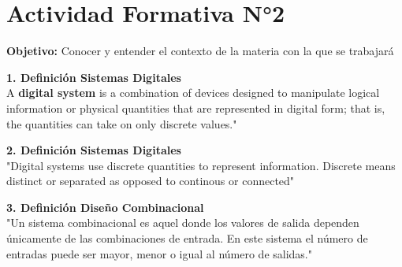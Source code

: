 \documentclass[12pt]{article}
\begin{document}
\begin{titlepage}
\begin{center}
\par{}

\begin{flushright}
\par{}
\end{flushright}

\end{center}

\par{}


\end{titlepage}




\section{Actividad Formativa N°2}
\vspace{1cm}
{\large \textbf{Objetivo:}} Conocer y entender el contexto de la materia con la que se trabajará

\vspace{.35cm}

\large\textbf{1. Definición Sistemas Digitales} \\
\normalsize A \textbf{digital system} is a combination of devices designed to manipulate logical information or physical quantities that are represented in digital form; that is, the quantities can take on only discrete values." \cite{tocci}

\vspace{.35cm}

\large\textbf{2. Definición Sistemas Digitales} \\
\normalsize "Digital systems use discrete quantities to represent information. Discrete means distinct or separated as opposed to continous or connected" \cite{godse} 

\vspace{.35cm}

\large\textbf{3. Definición Diseño Combinacional} \\
\normalsize "Un sistema combinacional es aquel donde los valores de salida dependen únicamente de las combinaciones de entrada. En este sistema el número de entradas puede ser mayor, menor o igual al número de salidas." \cite{garza}
\end{document}
